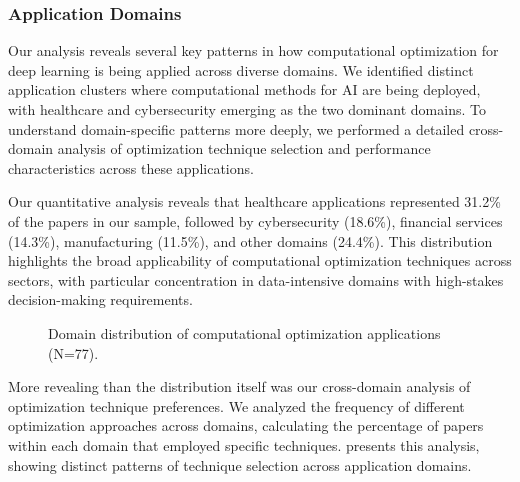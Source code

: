 \documentclass[format=acmsmall, natbib=true, citestyle=acmauthoryear]{acmart}
\begin{document}
\subsubsection{Application Domains}\label{subsubsec:overview-of-included-studies:application-domains}
Our analysis reveals several key patterns in how computational optimization for deep learning is being applied across diverse domains. We identified distinct application clusters where computational methods for AI are being deployed, with healthcare and cybersecurity emerging as the two dominant domains. To understand domain-specific patterns more deeply, we performed a detailed cross-domain analysis of optimization technique selection and performance characteristics across these applications.

Our quantitative analysis reveals that healthcare applications represented 31.2\% of the papers in our sample, followed by cybersecurity (18.6\%), financial services (14.3\%), manufacturing (11.5\%), and other domains (24.4\%). This distribution highlights the broad applicability of computational optimization techniques across sectors, with particular concentration in data-intensive domains with high-stakes decision-making requirements.

\begin{figure}[ht]
    \centering
    \caption{Domain distribution of computational optimization applications (N=77).}
    \label{fig:domain_distribution}
\end{figure}

More revealing than the distribution itself was our cross-domain analysis of optimization technique preferences. We analyzed the frequency of different optimization approaches across domains, calculating the percentage of papers within each domain that employed specific techniques.  presents this analysis, showing distinct patterns of technique selection across application domains.
\end{document}
